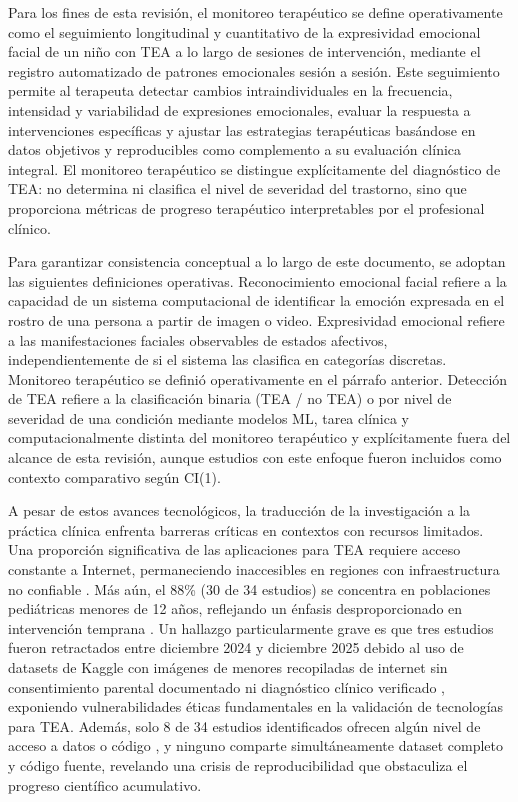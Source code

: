 \documentclass[ASNA,twocolumn]{USG}
\begin{document}
	Para los fines de esta revisión, el monitoreo terapéutico se define
	operativamente como el seguimiento longitudinal y cuantitativo de la
	expresividad emocional facial de un niño con TEA a lo largo de sesiones de
	intervención, mediante el registro automatizado de patrones emocionales sesión a
	sesión. Este seguimiento permite al terapeuta detectar cambios intraindividuales
	en la frecuencia, intensidad y variabilidad de expresiones emocionales, evaluar
	la respuesta a intervenciones específicas y ajustar las estrategias terapéuticas
	basándose en datos objetivos y reproducibles como complemento a su evaluación
	clínica integral. El monitoreo terapéutico se distingue explícitamente del
	diagnóstico de TEA: no determina ni clasifica el nivel de severidad del trastorno,
	sino que proporciona métricas de progreso terapéutico interpretables por el
	profesional clínico.
	
	Para garantizar consistencia conceptual a lo largo de este documento, se adoptan
	las siguientes definiciones operativas. Reconocimiento emocional facial refiere a
	la capacidad de un sistema computacional de identificar la emoción expresada en
	el rostro de una persona a partir de imagen o video. Expresividad emocional
	refiere a las manifestaciones faciales observables de estados afectivos,
	independientemente de si el sistema las clasifica en categorías discretas.
	Monitoreo terapéutico se definió operativamente en el párrafo anterior.
	Detección de TEA refiere a la clasificación binaria (TEA / no TEA) o por nivel
	de severidad de una condición mediante modelos ML, tarea clínica y
	computacionalmente distinta del monitoreo terapéutico y explícitamente fuera del
	alcance de esta revisión, aunque estudios con este enfoque fueron incluidos como
	contexto comparativo según CI(1).
	
	A pesar de estos avances tecnológicos, la traducción de la investigación a la
	práctica clínica enfrenta barreras críticas en contextos con recursos limitados.
	Una proporción significativa de las aplicaciones para TEA requiere acceso
	constante a Internet, permaneciendo inaccesibles en regiones con infraestructura
	no confiable \cite{Levy2024}. Más aún, el 88\% (30 de 34 estudios) se concentra en
	poblaciones pediátricas menores de 12 años, reflejando un énfasis desproporcionado
	en intervención temprana \cite{Washington2022}. Un hallazgo particularmente grave es que tres estudios fueron retractados entre diciembre 2024 y diciembre 2025 debido al uso de datasets de	Kaggle con imágenes de menores recopiladas de internet sin consentimiento parental documentado ni diagnóstico clínico verificado \cite{Gungor2025,Mahmood2025,Kumar2024}, exponiendo vulnerabilidades éticas fundamentales en la validación de tecnologías para TEA. Además, solo 8 de 34 estudios identificados ofrecen algún nivel de acceso a datos o código \cite{Sariyanidi2025,Hassan2025}, y ninguno comparte
	simultáneamente dataset completo y código fuente, revelando una crisis de reproducibilidad que obstaculiza el progreso científico acumulativo.
	
\end{document}

